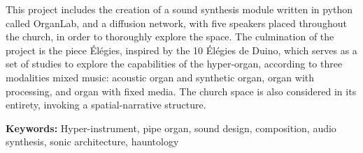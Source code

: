 \documentclass[12pt,twoside,maitrise]{dms_ks}
\newlength{\oldparskip}
\let\oldtableofcontents\tableofcontents  %
\renewcommand{\tableofcontents}{  %
    \begingroup
    \setlength{\parskip}{0pt}  %
    \oldtableofcontents  %
    \endgroup
    \setlength{\parskip}{\oldparskip}  %
}
\theoremstyle{definition}
\begin{document}
This project includes the creation of a sound synthesis module written in python called OrganLab, and a diffusion network, with five speakers placed throughout the church, in order to thoroughly explore the space. 
The culmination of the project is the piece Élégies, inspired by the 10 Élégies de Duino, which serves as a set of studies to explore the capabilities of the hyper-organ, according to three modalities mixed music: acoustic organ and synthetic organ, organ with processing, and organ with fixed media. 
The church space is also considered in its entirety, invoking a spatial-narrative structure. 

\textbf{Keywords:} Hyper-instrument, pipe organ, sound design, composition, audio synthesis, sonic architecture, hauntology



\anglais
\cleardoublepage
{}  %
\anglais
\tableofcontents
\cleardoublepage
\anglais
\english
{}  %
\cleardoublepage
{}
\end{document}
